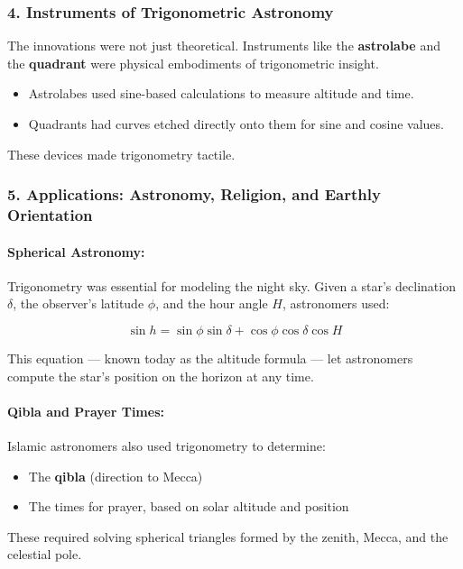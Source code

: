 \subsubsection*{4. Instruments of Trigonometric Astronomy}

The innovations were not just theoretical. Instruments like the \textbf{astrolabe} and the \textbf{quadrant} were physical embodiments of trigonometric insight.

\begin{itemize}
    \item Astrolabes used sine-based calculations to measure altitude and time.
    \item Quadrants had curves etched directly onto them for sine and cosine values.
\end{itemize}

These devices made trigonometry tactile.

\subsubsection*{5. Applications: Astronomy, Religion, and Earthly Orientation}

\paragraph{Spherical Astronomy:} Trigonometry was essential for modeling the night sky. Given a star’s declination \( \delta \), the observer’s latitude \( \phi \), and the hour angle \( H \), astronomers used:

\[
\sin h = \sin \phi \sin \delta + \cos \phi \cos \delta \cos H
\]

This equation — known today as the altitude formula — let astronomers compute the star’s position on the horizon at any time.

\paragraph{Qibla and Prayer Times:} Islamic astronomers also used trigonometry to determine:

\begin{itemize}
    \item The \textbf{qibla} (direction to Mecca)
    \item The times for prayer, based on solar altitude and position
\end{itemize}

These required solving spherical triangles formed by the zenith, Mecca, and the celestial pole.

